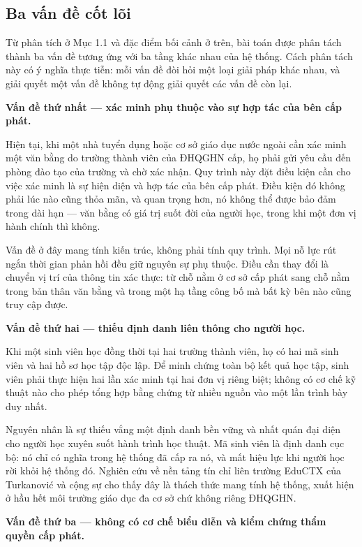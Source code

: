 \subsection{Ba vấn đề cốt lõi}

Từ phân tích ở Mục 1.1 và đặc điểm bối cảnh ở trên, bài toán được phân tách thành ba vấn đề tương ứng với ba tầng khác nhau của hệ thống. Cách phân tách này có ý nghĩa thực tiễn: mỗi vấn đề đòi hỏi một loại giải pháp khác nhau, và giải quyết một vấn đề không tự động giải quyết các vấn đề còn lại.

\noindent \textbf{Vấn đề thứ nhất --- xác minh phụ thuộc vào sự hợp tác của bên cấp phát.}

Hiện tại, khi một nhà tuyển dụng hoặc cơ sở giáo dục nước ngoài cần xác minh một văn bằng do trường thành viên của ĐHQGHN cấp, họ phải gửi yêu cầu đến phòng đào tạo của trường và chờ xác nhận. Quy trình này đặt điều kiện cần cho việc xác minh là sự hiện diện và hợp tác của bên cấp phát. Điều kiện đó không phải lúc nào cũng thỏa mãn, và quan trọng hơn, nó không thể được bảo đảm trong dài hạn --- văn bằng có giá trị suốt đời của người học, trong khi một đơn vị hành chính thì không.

Vấn đề ở đây mang tính kiến trúc, không phải tính quy trình. Mọi nỗ lực rút ngắn thời gian phản hồi đều giữ nguyên sự phụ thuộc. Điều cần thay đổi là chuyển vị trí của thông tin xác thực: từ chỗ nằm ở cơ sở cấp phát sang chỗ nằm trong bản thân văn bằng và trong một hạ tầng công bố mà bất kỳ bên nào cũng truy cập được.

\noindent \textbf{Vấn đề thứ hai --- thiếu định danh liên thông cho người học.}

Khi một sinh viên học đồng thời tại hai trường thành viên, họ có hai mã sinh viên và hai hồ sơ học tập độc lập. Để minh chứng toàn bộ kết quả học tập, sinh viên phải thực hiện hai lần xác minh tại hai đơn vị riêng biệt; không có cơ chế kỹ thuật nào cho phép tổng hợp bằng chứng từ nhiều nguồn vào một lần trình bày duy nhất.

Nguyên nhân là sự thiếu vắng một định danh bền vững và nhất quán đại diện cho người học xuyên suốt hành trình học thuật. Mã sinh viên là định danh cục bộ: nó chỉ có nghĩa trong hệ thống đã cấp ra nó, và mất hiệu lực khi người học rời khỏi hệ thống đó. Nghiên cứu về nền tảng tín chỉ liên trường EduCTX của Turkanović và cộng sự \cite{Turkanovic2018} cho thấy đây là thách thức mang tính hệ thống, xuất hiện ở hầu hết môi trường giáo dục đa cơ sở chứ không riêng ĐHQGHN.

\noindent \textbf{Vấn đề thứ ba --- không có cơ chế biểu diễn và kiểm chứng thẩm quyền cấp phát.}

